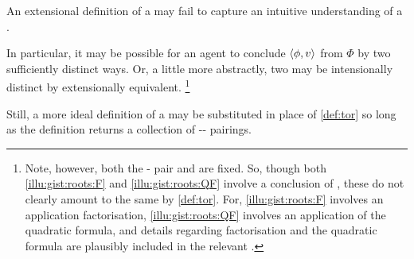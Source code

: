 \begin{note}
  An extensional definition of a  may fail to capture an intuitive understanding of a .

  In particular, it may be possible for an agent to conclude \(\langle\phi, v\rangle\) from \(\Phi\) by two sufficiently distinct ways.
  Or, a little more abstractly, two  may be intensionally distinct by extensionally equivalent.%
  \footnote{
    Note, however, both the - pair and \pool{} are fixed.
    So, though both \autoref{illu:gist:roots:F} and \autoref{illu:gist:roots:QF} involve a conclusion of , these  do not clearly amount to the same \torN{} by \autoref{def:tor}.
    For, \autoref{illu:gist:roots:F} involves an application factorisation, \autoref{illu:gist:roots:QF} involves an application of the quadratic formula, and details regarding factorisation and the quadratic formula are plausibly included in the relevant .
  }

  Still, a more ideal definition of a  may be substituted in place of \autoref{def:tor} so long as the definition returns a collection of -- pairings.
\end{note}


